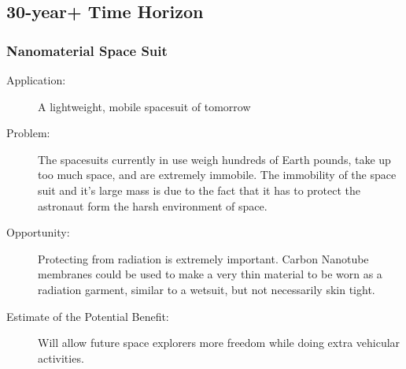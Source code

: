 \subsection{30-year+ Time Horizon}

\subsubsection{Nanomaterial  Space Suit } 
\label{nano-suit}
\begin{description}  \item[Application:] A lightweight, mobile spacesuit of tomorrow
 
\item[Problem:] The spacesuits  currently in use weigh hundreds of Earth pounds, take up too much space,  and are extremely immobile. The immobility of the space suit and it's  large mass is due to the fact that it has to protect the astronaut form  the harsh environment of space. 
 
\item[Opportunity:] Protecting  from radiation is extremely important. Carbon Nanotube membranes could  be used to make a very thin material to be worn as a radiation garment,  similar to a wetsuit, but not necessarily skin tight. 
 
\item[Estimate of the Potential  Benefit:]Will allow future space explorers more freedom while doing  extra vehicular activities.
\end{description}

 
